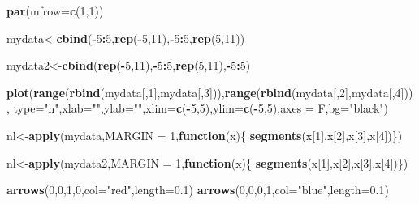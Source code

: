 \documentclass[
]{book}
\newenvironment{Shaded}{\begin{snugshade}}{\end{snugshade}}
\newcommand{\ControlFlowTok}[1]{\textcolor[rgb]{0.13,0.29,0.53}{\textbf{#1}}}
\newcommand{\DataTypeTok}[1]{\textcolor[rgb]{0.13,0.29,0.53}{#1}}
\newcommand{\DecValTok}[1]{\textcolor[rgb]{0.00,0.00,0.81}{#1}}
\newcommand{\FloatTok}[1]{\textcolor[rgb]{0.00,0.00,0.81}{#1}}
\newcommand{\KeywordTok}[1]{\textcolor[rgb]{0.13,0.29,0.53}{\textbf{#1}}}
\newcommand{\NormalTok}[1]{#1}
\newcommand{\OperatorTok}[1]{\textcolor[rgb]{0.81,0.36,0.00}{\textbf{#1}}}
\newcommand{\StringTok}[1]{\textcolor[rgb]{0.31,0.60,0.02}{#1}}
\theoremstyle{definition}
\theoremstyle{definition}
\theoremstyle{definition}
\theoremstyle{remark}
\begin{document}
\begin{Shaded}
\begin{Highlighting}[]
\KeywordTok{par}\NormalTok{(}\DataTypeTok{mfrow=}\KeywordTok{c}\NormalTok{(}\DecValTok{1}\NormalTok{,}\DecValTok{1}\NormalTok{))}

\NormalTok{mydata<-}\KeywordTok{cbind}\NormalTok{(}\OperatorTok{-}\DecValTok{5}\OperatorTok{:}\DecValTok{5}\NormalTok{,}\KeywordTok{rep}\NormalTok{(}\OperatorTok{-}\DecValTok{5}\NormalTok{,}\DecValTok{11}\NormalTok{),}\OperatorTok{-}\DecValTok{5}\OperatorTok{:}\DecValTok{5}\NormalTok{,}\KeywordTok{rep}\NormalTok{(}\DecValTok{5}\NormalTok{,}\DecValTok{11}\NormalTok{))}

\NormalTok{mydata2<-}\KeywordTok{cbind}\NormalTok{(}\KeywordTok{rep}\NormalTok{(}\OperatorTok{-}\DecValTok{5}\NormalTok{,}\DecValTok{11}\NormalTok{),}\OperatorTok{-}\DecValTok{5}\OperatorTok{:}\DecValTok{5}\NormalTok{,}\KeywordTok{rep}\NormalTok{(}\DecValTok{5}\NormalTok{,}\DecValTok{11}\NormalTok{),}\OperatorTok{-}\DecValTok{5}\OperatorTok{:}\DecValTok{5}\NormalTok{)}

\KeywordTok{plot}\NormalTok{(}\KeywordTok{range}\NormalTok{(}\KeywordTok{rbind}\NormalTok{(mydata[,}\DecValTok{1}\NormalTok{],mydata[,}\DecValTok{3}\NormalTok{])),}\KeywordTok{range}\NormalTok{(}\KeywordTok{rbind}\NormalTok{(mydata[,}\DecValTok{2}\NormalTok{],mydata[,}\DecValTok{4}\NormalTok{])),}
     \DataTypeTok{type=}\StringTok{"n"}\NormalTok{,}\DataTypeTok{xlab=}\StringTok{""}\NormalTok{,}\DataTypeTok{ylab=}\StringTok{""}\NormalTok{,}\DataTypeTok{xlim=}\KeywordTok{c}\NormalTok{(}\OperatorTok{-}\DecValTok{5}\NormalTok{,}\DecValTok{5}\NormalTok{),}\DataTypeTok{ylim=}\KeywordTok{c}\NormalTok{(}\OperatorTok{-}\DecValTok{5}\NormalTok{,}\DecValTok{5}\NormalTok{),}\DataTypeTok{axes =}\NormalTok{ F,}\DataTypeTok{bg=}\StringTok{"black"}\NormalTok{)}


\NormalTok{nl<-}\KeywordTok{apply}\NormalTok{(mydata,}\DataTypeTok{MARGIN =} \DecValTok{1}\NormalTok{,}\ControlFlowTok{function}\NormalTok{(x)\{}
  \KeywordTok{segments}\NormalTok{(x[}\DecValTok{1}\NormalTok{],x[}\DecValTok{2}\NormalTok{],x[}\DecValTok{3}\NormalTok{],x[}\DecValTok{4}\NormalTok{])\})}

\NormalTok{nl<-}\KeywordTok{apply}\NormalTok{(mydata2,}\DataTypeTok{MARGIN =} \DecValTok{1}\NormalTok{,}\ControlFlowTok{function}\NormalTok{(x)\{}
  \KeywordTok{segments}\NormalTok{(x[}\DecValTok{1}\NormalTok{],x[}\DecValTok{2}\NormalTok{],x[}\DecValTok{3}\NormalTok{],x[}\DecValTok{4}\NormalTok{])\})}


\KeywordTok{arrows}\NormalTok{(}\DecValTok{0}\NormalTok{,}\DecValTok{0}\NormalTok{,}\DecValTok{1}\NormalTok{,}\DecValTok{0}\NormalTok{,}\DataTypeTok{col=}\StringTok{"red"}\NormalTok{,}\DataTypeTok{length=}\FloatTok{0.1}\NormalTok{)}
\KeywordTok{arrows}\NormalTok{(}\DecValTok{0}\NormalTok{,}\DecValTok{0}\NormalTok{,}\DecValTok{0}\NormalTok{,}\DecValTok{1}\NormalTok{,}\DataTypeTok{col=}\StringTok{"blue"}\NormalTok{,}\DataTypeTok{length=}\FloatTok{0.1}\NormalTok{)}
\end{Highlighting}
\end{Shaded}
\end{document}
